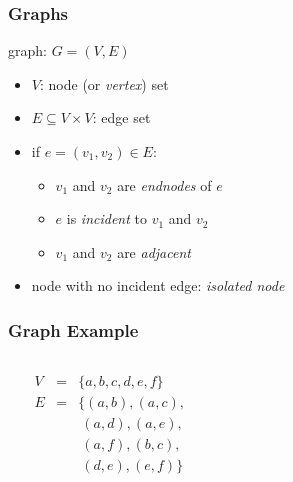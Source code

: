 \documentclass[dvipsnames]{beamer}
\begin{document}
\begin{frame}
  \frametitle{Graphs}

  \begin{definition}
    \alert{graph}: $G=(V,E)$

    \begin{itemize}
      \item $V$: \alert{node} (or \emph{vertex}) set
      \item $E \subseteq V \times V$: \alert{edge} set
    \end{itemize}
  \end{definition}

  \pause
  \begin{itemize}
    \item if $e=(v_1,v_2) \in E$:
    \begin{itemize}
      \item $v_1$ and $v_2$ are \emph{endnodes} of $e$
      \item $e$ is \emph{incident} to $v_1$ and $v_2$
      \item $v_1$ and $v_2$ are \emph{adjacent}
    \end{itemize}

    \item node with no incident edge: \emph{isolated node}
  \end{itemize}
\end{frame}

\begin{frame}
  \frametitle{Graph Example}

  \begin{example}
    \begin{columns}
      \begin{center}
      \end{center}

      $\begin{array}{lcl}
        V & = & \{a,b,c,d,e,f\}\\
        E & = & \{(a,b),(a,c),\\
          &   & ~(a,d),(a,e),\\
          &   & ~(a,f),(b,c),\\
          &   & ~(d,e),(e,f)\}
      \end{array}$
    \end{columns}
  \end{example}
\end{frame}
\end{document}
